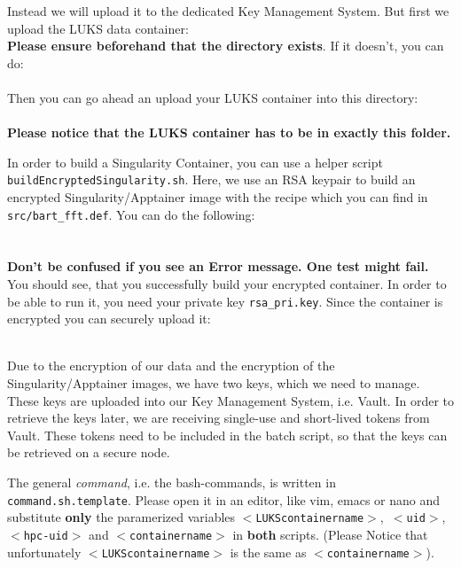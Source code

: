 \documentclass[paper=a4]{scrartcl}
\begin{document}
Instead we will upload it to the dedicated Key Management System. 
But first we upload the LUKS data container:\\
\textbf{Please ensure beforehand that the directory exists}.
If it doesn't, you can do: \\
 \\
Then you can go ahead an upload your LUKS container into this directory: \\
 \\
\textbf{Please notice that the LUKS container has to be in exactly this folder.}

In order to build a Singularity Container, you can use a helper script \texttt{buildEncryptedSingularity.sh}. 
Here, we use an RSA keypair to build an encrypted Singularity/Apptainer image with the recipe which you can find in \texttt{src/bart\_fft.def}. 
You can do the following: \\
 \\
 \\
\textbf{Don't be confused if you see an Error message. One test might fail.} \\
You should see, that you successfully build your encrypted container. In order to be able to run it, you need your private key \texttt{rsa\_pri.key}. 
Since the container is encrypted you can securely upload it: \\
 \\

Due to the encryption of our data and the encryption of the Singularity/Apptainer images, we have two keys, which we need to manage. 
These keys are uploaded into our Key Management System, i.e. Vault. 
In order to retrieve the keys later, we are receiving single-use and short-lived tokens from Vault. 
These tokens need to be included in the batch script, so that the keys can be retrieved on a secure node. 

The general \textit{command}, i.e. the bash-commands, is written in \texttt{command.sh.template}. 
Please open it in an editor, like vim, emacs or nano and substitute \textbf{only} the paramerized variables \texttt{$<$LUKScontainername$>$},\texttt{ $<$uid$>$}, \\\texttt{$<$hpc-uid$>$} and \texttt{$<$containername$>$} in \textbf{both} scripts. 
(Please Notice that unfortunately \texttt{$<$LUKScontainername$>$} is the same as \texttt{$<$containername$>$}).
\end{document}
